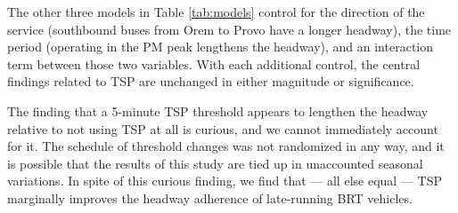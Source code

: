 \documentclass[3p, authoryear, review]{elsarticle} %
\begin{document}
The other three models in Table \ref{tab:models} control for the direction
of the service (southbound buses from Orem to Provo have a longer headway), the
time period (operating in the PM peak lengthens the headway), and an interaction
term between those two variables. With each additional control, the central
findings related to TSP are unchanged in either magnitude or significance.

The finding that a 5-minute TSP threshold appears to lengthen the headway
relative to not using TSP at all is curious, and we cannot immediately
account for it. The schedule of threshold changes was not randomized in any way,
and it is possible that the results of this study are tied up in unaccounted
seasonal variations. In spite of this curious finding, we find that --- all else
equal --- TSP marginally improves the headway adherence of late-running BRT
vehicles.


\end{document}
